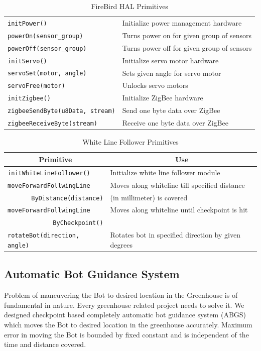 \documentclass[a4paper, 12pt]{article}
\begin{document}
\begin{table}
\begin{tabular}{|l|l|}
 \hline
 \texttt{initPower()} & Initialize power management hardware\\
 \texttt{powerOn(sensor\_group)} & Turns power on for given group of sensors\\
 \texttt{powerOff(sensor\_group)} & Turns power off for given group of sensors\\
 \hline
 \texttt{initServo()} & Initialize servo motor hardware\\
 \texttt{servoSet(motor, angle)} & Sets given angle for servo motor\\
 \texttt{servoFree(motor)} &  Unlocks servo motors\\
 \hline
 \texttt{initZigbee()} & Initialize ZigBee hardware\\
 \texttt{zigbeeSendByte(u8Data, stream)} & Send one byte data over ZigBee\\
 \texttt{zigbeeReceiveByte(stream)} &  Receive one byte data over ZigBee\\
 \hline
 \end{tabular}
 \caption{FireBird HAL Primitives}
 \label{table-hal-primitives}
\end{table}

\begin{table}
 \centering
 \begin{tabular}{|l|l|}
 \hline
 \multicolumn{1}{|c|}{\textbf{Primitive}} & \multicolumn{1}{|c|}{\textbf{Use}}\\
 \hline \hline
 \texttt{initWhiteLineFollower()} & Initialize white line follower module\\
 \texttt{moveForwardFollwingLine} & Moves along whiteline till specified distance\\
 \multicolumn{1}{|r|}{\texttt{ByDistance(distance)}}& (in millimeter) is covered\\
 \texttt{moveForwardFollwingLine} & Moves along whiteline until checkpoint is hit\\
 \multicolumn{1}{|r|}{\texttt{ByCheckpoint()}} & \\
 \texttt{rotateBot(direction, angle)} & Rotates bot in specified direction by given degrees\\ 
 \hline
 \end{tabular}
 \caption{White Line Follower Primitives}
 \label{table-wlf-primitives}
\end{table}

\subsection{Automatic Bot Guidance System} \label{section-bgs}
Problem of maneuvering the Bot to desired location in the Greenhouse is of fundamental in nature. Every
greenhouse related project needs to solve it. We designed checkpoint based completely automatic bot guidance
system (ABGS) which moves the Bot to desired location in the greenhouse accurately. Maximum error in moving the Bot is
bounded by fixed constant and is independent of the time and distance covered.
\end{document}

